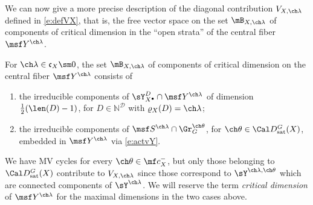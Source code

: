We can now give a more precise description of the diagonal contribution
$V_{X,\ch\lambda}$ defined in \eqref{e:defVX}, that is, the free vector space on the set $\mB_{X,\ch\lambda}$ of components of critical dimension in the ``open strata'' of the central fiber $\msf Y^{\ch\lambda}$.

\begin{prop}
\notready \label{prop:Vbasis}
For $\ch\lambda\in \mathfrak c_X \sm 0$, the set $\mB_{X,\ch\lambda}$ of components of critical dimension on the central fiber $\msf Y^{\ch\lambda}$ consists of
\begin{enumerate}
\item the irreducible components of $\sY^D_{X^\bullet}\cap \msf Y^{\ch\lambda}$ of dimension $\frac 1 2(\len(D)-1)$,
for $D\in \mathbb N^{\mathcal D}$ with $\varrho_X(D) =\ch\lambda$;
\item the irreducible components of $\msf S^{\ch\lambda} \cap \Gr_G^{\ch\theta}$,
for $\ch\theta \in \Cal D^G_{\mathrm{sat}}(X)$, embedded in $\msf Y^{\ch\lambda}$ via \eqref{e:actvY}.
\end{enumerate}
\end{prop}

\begin{rem}
\notready \label{rem:othertheta}
We have MV cycles for every $\ch\theta \in \mf c_X^-$, but only those belonging to $\Cal D^G_{\mathrm{sat}}(X)$
contribute to $V_{X,\ch\lambda}$ since those correspond to $\sY^{\ch\lambda,\ch\theta}$ which are
connected components of $\sY^{\ch\lambda}$. We will reserve the term \emph{critical dimension} of
$\msf Y^{\ch\lambda}$ for the maximal dimensions in the two cases above.
\end{rem}



